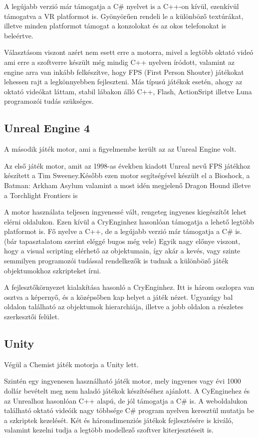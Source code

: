 \documentclass[colorlinks]{thesis-ekf}
\theoremstyle{definition}
\theoremstyle{remark}
\begin{document}
A legújabb verzió már támogatja a C\# nyelvet is a C++-on kívül, ezenkívül támogatva a VR platformot is. Gyönyörűen rendeli le a különböző textúrákat, illetve minden platformot támogat a konzolokat és az okos telefonokat is beleértve.\cite{cry}

Választásom viszont azért nem esett erre a motorra, mivel a legtöbb oktató videó ami erre a szoftverre készült még mindig C++ nyelven íródott, valamint az engine arra van inkább felkészítve, hogy FPS (First Person Shouter) játékokat lehessen rajt a legkönnyebben fejleszteni. Más típusú játékok esetén, ahogy az oktató videókat láttam, stabil lábakon álló C++, Flash, ActionSript illetve Luna programozói tudás szükséges.
\subsection{Unreal Engine 4}
A második játék motor, ami a figyelmembe került az az Unreal Engine volt. 

Az első játék motor, amit az 1998-as években kiadott Unreal nevű FPS játékhoz készített a Tim Sweeney.\cite{wiki_unreal}Később ezen motor segítségével készült el a Bioshock, a Batman: Arkham Asylum\cite{unreal_game_list} valamint a most idén megjelenő Dragon Hound illetve a Torchlight Frontiers is\cite{unreal_news}

A motor használata teljesen ingyenessé vált, rengeteg ingyenes kiegészítőt lehet elérni oldalukon. Ezen kívül a CryEnginhez hasonlóan támogatja a lehető legtöbb platformot is. Fő nyelve a C++, de a legújabb verzió már támogatja a C\# is. (bár tapasztalatom szerint eléggé bugos még vele) Egyik nagy előnye viszont, hogy a visual scripting elérhető az objektumain, így akár a kevés, vagy szinte semmilyen programozói tudással rendelkezők is tudnak a különböző játék objektumokhoz szkripteket írni.

A fejlesztőkörnyezet kialakítása hasonló a CryEnginhez. Itt is három oszlopra van osztva a képernyő, és a középsőben kap helyet a játék nézet. Ugyanúgy bal oldalon található az objektumok hierarchiája, illetve a jobb oldalon a részletes szerkesztői felület.
\subsection{Unity}
Végül a Chemist játék motorja a Unity lett. 

Szintén egy ingyenesen használható játék motor, mely ingyenes vagy évi 1000 dollár bevételt meg nem haladó játékok készítéséhez ajánlott. A CyEnginehez és az Unrealhoz hasonlóan C++ alapú, de jól támogatja a C\# is. A weboldalukon található oktató videóik nagy többsége C\# program nyelven keresztül mutatja be a szkriptek kezelését. Két és háromdimenziós játékok fejlesztésére is kiváló, valamint kezelni tudja a legtöbb modellező szoftver kiterjesztéseit is. \cite{unity_web} 
\end{document}
